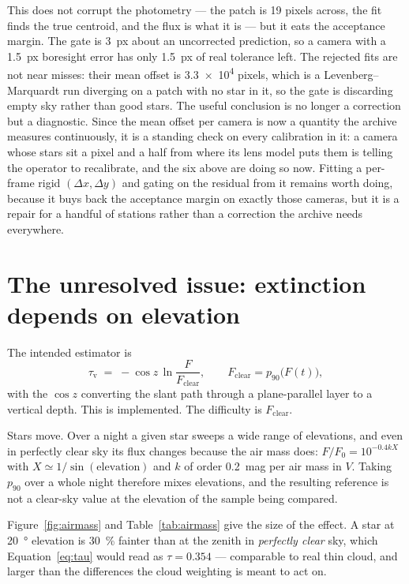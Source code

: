 \documentclass[11pt,a4paper]{article}
\begin{document}
This does not corrupt the photometry --- the patch is 19 pixels across, the fit
finds the true centroid, and the flux is what it is --- but it eats the
acceptance margin. The gate is \SI{3}{px} about an uncorrected prediction, so a
camera with a \SI{1.5}{px} boresight error has only \SI{1.5}{px} of real
tolerance left. The rejected fits are not near misses: their mean offset is
\num{3.3e4} pixels, which is a Levenberg--Marquardt run diverging on a patch
with no star in it, so the gate is discarding empty sky rather than good stars.
The useful conclusion is no longer a correction but a diagnostic. Since the
mean offset per camera is now a quantity the archive measures continuously, it
is a standing check on every calibration in it: a camera whose stars sit a
pixel and a half from where its lens model puts them is telling the operator to
recalibrate, and the six above are doing so now. Fitting a per-frame rigid
$(\Delta x,\Delta y)$ and gating on the residual from it remains worth doing,
because it buys back the acceptance margin on exactly those cameras, but it is
a repair for a handful of stations rather than a correction the archive needs
everywhere.

\section{The unresolved issue: extinction depends on elevation}
\label{sec:airmass}

The intended estimator is
\begin{equation}
  \tau_{\mathrm{v}} \;=\; -\cos z\,\ln\!\frac{F}{F_{\mathrm{clear}}},
  \qquad F_{\mathrm{clear}} = p_{90}\bigl(F(t)\bigr),
  \label{eq:tau}
\end{equation}
with the $\cos z$ converting the slant path through a plane-parallel layer to a
vertical depth. This is implemented. The difficulty is $F_{\mathrm{clear}}$.

Stars move. Over a night a given star sweeps a wide range of elevations, and
even in perfectly clear sky its flux changes because the air mass does:
$F/F_0 = 10^{-0.4kX}$ with $X\simeq1/\sin(\text{elevation})$ and $k$ of order
\SI{0.2}{mag} per air mass in $V$. Taking $p_{90}$ over a whole night therefore
mixes elevations, and the resulting reference is not a clear-sky value at the
elevation of the sample being compared.

Figure~\ref{fig:airmass} and Table~\ref{tab:airmass} give the size of the
effect. A star at \SI{20}{\degree} elevation is \SI{30}{\percent} fainter than
at the zenith in \emph{perfectly clear} sky, which
Equation~\eqref{eq:tau} would read as $\tau=\num{0.354}$ --- comparable to real
thin cloud, and larger than the differences the cloud weighting is meant to act
on.
\end{document}
